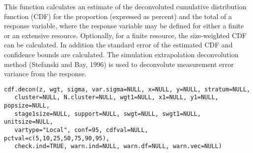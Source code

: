 \begin{Description}\relax
This function calculates an estimate of the deconvoluted cumulative 
distribution function (CDF) for the proportion (expressed as percent) and 
the total of a response variable, where the response variable may be defined
for either a finite or an extensive resource.  Optionally, for a finite 
resource, the size-weighted CDF can be calculated.  In addition the standard 
error of the estimated CDF and confidence bounds are calculated.  The 
simulation extrapolation deconvolution method (Stefanski and Bay, 1996) is
used to deconvolute measurement error variance from the response.
\end{Description}
\begin{Usage}
\begin{verbatim}
cdf.decon(z, wgt, sigma, var.sigma=NULL, x=NULL, y=NULL, stratum=NULL,
   cluster=NULL, N.cluster=NULL, wgt1=NULL, x1=NULL, y1=NULL, popsize=NULL,
   stage1size=NULL, support=NULL, swgt=NULL, swgt1=NULL, unitsize=NULL,
   vartype="Local", conf=95, cdfval=NULL, pctval=c(5,10,25,50,75,90,95),
   check.ind=TRUE, warn.ind=NULL, warn.df=NULL, warn.vec=NULL)
\end{verbatim}
\end{Usage}

